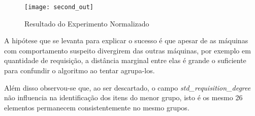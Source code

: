 \begin{figure}[htbp]
\centering
\texttt{[image: second\_out]}
\caption[Resultado do Experimento Normalizado]{Resultado do Experimento Normalizado} \label{fig:second_out}
\end{figure}

A hipótese que se levanta para explicar o sucesso é que apesar de as máquinas com comportamento suspeito divergirem das outras máquinas, por exemplo em quantidade de requisição, a distância marginal entre elas é grande o suficiente para confundir o algoritmo ao tentar agrupa-los.

Além disso observou-se que, ao ser descartado, o campo \textit{std\_requisition\_degree} não influencia na identificação dos itens do menor grupo, isto é os mesmo 26 elementos permanecem consistentemente no mesmo grupos.